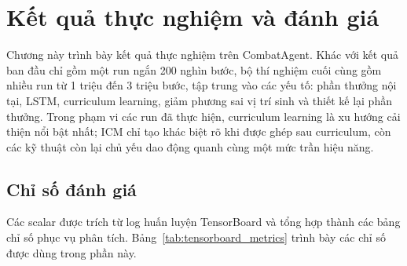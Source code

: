 \clearpage
{}

\setcounter{chapter}{3}
\chapter[{KẾT QUẢ THỰC NGHIỆM VÀ ĐÁNH GIÁ}]{Kết quả thực nghiệm và đánh giá}

Chương này trình bày kết quả thực nghiệm trên CombatAgent. Khác với kết quả ban đầu chỉ gồm một run ngắn 200 nghìn bước, bộ thí nghiệm cuối cùng gồm nhiều run từ 1 triệu đến 3 triệu bước, tập trung vào các yếu tố: phần thưởng nội tại, LSTM, curriculum learning, giảm phương sai vị trí sinh và thiết kế lại phần thưởng. Trong phạm vi các run đã thực hiện, curriculum learning là xu hướng cải thiện nổi bật nhất; ICM chỉ tạo khác biệt rõ khi được ghép sau curriculum, còn các kỹ thuật còn lại chủ yếu dao động quanh cùng một mức trần hiệu năng.

\section{Chỉ số đánh giá}

Các scalar được trích từ log huấn luyện TensorBoard và tổng hợp thành các bảng chỉ số phục vụ phân tích. Bảng~\ref{tab:tensorboard_metrics} trình bày các chỉ số được dùng trong phần này.

